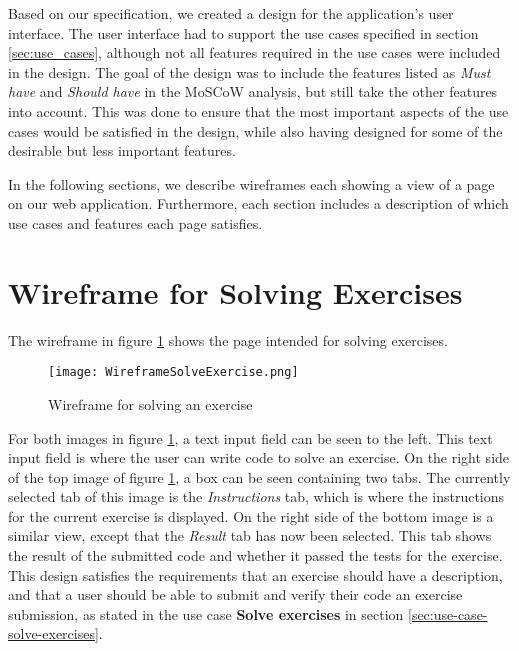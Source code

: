 Based on our specification, we created a design for the application's user interface. The user interface had to support the use cases specified in section \ref*{sec:use_cases}, although not all features required in the use cases were included in the design. The goal of the design was to include the features listed as \textit{Must have} and \textit{Should have} in the MoSCoW analysis, but still take the other features into account. This was done to ensure that the most important aspects of the use cases would be satisfied in the design, while also having designed for some of the desirable but less important features.

In the following sections, we describe wireframes each showing a view of a page on our web application. Furthermore, each section includes a description of which use cases and features each page satisfies.

\section{Wireframe for Solving Exercises}
The wireframe in figure \ref{fig:wfExercise} shows the page intended for solving exercises.
\begin{figure}[H]
	\texttt{[image: WireframeSolveExercise.png]}
	\centering
	\caption{Wireframe for solving an exercise}
	\label{fig:wfExercise}
\end{figure}

For both images in figure \ref{fig:wfExercise}, a text input field can be seen to the left. This text input field is where the user can write code to solve an exercise. On the right side of the top image of figure \ref{fig:wfExercise}, a box can be seen containing two tabs. The currently selected tab of this image is the \textit{Instructions} tab, which is where the instructions for the current exercise is displayed. On the right side of the bottom image is a similar view, except that the \textit{Result} tab has now been selected. This tab shows the result of the submitted code and whether it passed the tests for the exercise. This design satisfies the requirements that an exercise should have a description, and that a user should be able to submit and verify their code an exercise submission, as stated in the use case \textbf{Solve exercises} in section \ref{sec:use-case-solve-exercises}.

